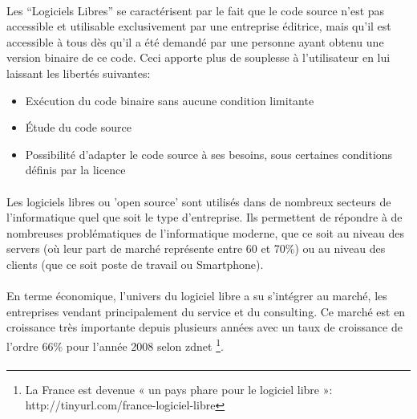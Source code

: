 \paragraph{}

Les ``Logiciels Libres'' se caractérisent par le fait
que le code source n'est pas accessible et utilisable exclusivement par
une entreprise éditrice, mais qu'il est accessible à tous dès qu'il a
été demandé par une personne ayant obtenu une version binaire de ce code.
Ceci apporte plus de souplesse à l'utilisateur en lui laissant les libertés
suivantes:

\begin{itemize}

  \item {Exécution du code binaire sans aucune condition limitante}

  \item {Étude du code source}

  \item {Possibilité d'adapter le code source à ses besoins, sous
  certaines conditions définis par la licence}

\end{itemize}

\paragraph {}

Les logiciels libres ou 'open source' sont utilisés dans de nombreux
secteurs de l'informatique quel que soit le type d'entreprise. Ils
permettent de répondre à de nombreuses problématiques de l'informatique
moderne, que ce soit au niveau des servers (où leur part de marché
représente entre 60 et 70\%) ou au niveau des clients (que
ce soit poste de travail ou Smartphone).

\paragraph {}

En terme économique, l'univers du logiciel libre a su s'intégrer
au marché, les entreprises vendant principalement du service et du
consulting. Ce marché est en croissance très importante depuis plusieurs
années avec un taux de croissance de l'ordre 66\% pour l'année 2008
selon zdnet \footnote{La France est devenue « un pays phare pour le
logiciel libre »: http://tinyurl.com/france-logiciel-libre}.

\paragraph{}

